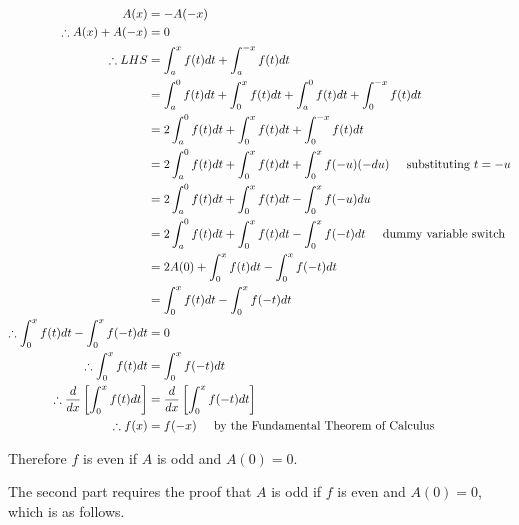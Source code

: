 \documentclass[a4paper]{article}
\begin{document}
\begin{enumerate}[label=\textbf{\arabic*.}]
\begin{enumerate}
\begin{enumerate}
		\begin{align*}
		A(x) & = -A(-x)\\
		\therefore A(x) + A(-x) & = 0\\
		\therefore LHS & = \int_{a}^{x}f(t)dt + \int_{a}^{-x}f(t)dt\\
		& = \int_{a}^{0}f(t)dt + \int_{0}^{x}f(t)dt + \int_{a}^{0}f(t)dt + \int_{0}^{-x}f(t)dt\\
		& = 2\int_{a}^{0}f(t)dt + \int_{0}^{x}f(t)dt + \int_{0}^{-x}f(t)dt\\
		& = 2\int_{a}^{0}f(t)dt + \int_{0}^{x}f(t)dt + \int_{0}^{x}f(-u)(-du) \hspace{5mm} \text{substituting $\displaystyle{t=-u}$}\\
		& = 2\int_{a}^{0}f(t)dt + \int_{0}^{x}f(t)dt - \int_{0}^{x}f(-u)du\\
		& = 2\int_{a}^{0}f(t)dt + \int_{0}^{x}f(t)dt - \int_{0}^{x}f(-t)dt \hspace{5mm} \text{dummy variable switch}\\
		& = 2A(0) + \int_{0}^{x}f(t)dt - \int_{0}^{x}f(-t)dt\\
		& = \int_{0}^{x}f(t)dt - \int_{0}^{x}f(-t)dt\\
		\therefore \int_{0}^{x}f(t)dt - \int_{0}^{x}f(-t)dt & = 0\\
		\therefore \int_{0}^{x}f(t)dt & = \int_{0}^{x}f(-t)dt\\
		\therefore \frac{d}{dx}\left[\int_{0}^{x}f(t)dt \right] & = \frac{d}{dx}\left[\int_{0}^{x}f(-t)dt \right]\\
		\therefore f(x) & = f(-x) \hspace{5mm} \text{by the Fundamental Theorem of Calculus}\\
		\end{align*}

		Therefore $\displaystyle{f}$ is even if $\displaystyle{A}$ is odd and $\displaystyle{A(0)=0}$.

		\pagebreak
		The second part requires the proof that $\displaystyle{A}$ is odd if $\displaystyle{f}$ is even and $\displaystyle{A(0)=0}$, which is as follows.


\end{enumerate}
\end{enumerate}
\end{enumerate}
\end{document}
